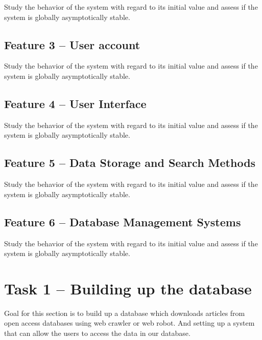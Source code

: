 \documentclass[a4paper]{article} %
\begin{document}
Study the behavior of the system with regard to its initial value and assess if the system is globally asymptotically stable.
 
\subsection*{Feature 3 -- User account}
\label{task1:feature3}

Study the behavior of the system with regard to its initial value and assess if the system is globally asymptotically stable.

\subsection*{Feature 4 -- User Interface}
\label{task1:feature4}

Study the behavior of the system with regard to its initial value and assess if the system is globally asymptotically stable.

\subsection*{Feature 5 -- Data Storage and Search Methods}
\label{task1:feature5}

Study the behavior of the system with regard to its initial value and assess if the system is globally asymptotically stable.

\subsection*{Feature 6 -- Database Management Systems}
\label{task1:feature6}

Study the behavior of the system with regard to its initial value and assess if the system is globally asymptotically stable.



\section*{Task 1 -- Building up the database}
\label{task1}

Goal for this section is to build up a database which downloads articles from open access databases using web crawler or web robot. And setting up a system that can allow the users to access the data in our database.
\end{document}
